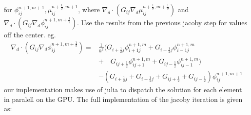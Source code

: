 \documentclass{mimosis}
\begin{document}
for \(\phi_{ij}^{n+1,m+1} , \mu_{ij}^{n+\frac{1}{2},m+1}\),
where \(\nabla _d \cdot (G_{ij} \nabla_d \mu_{ij}^{n+\frac{1}{2},m+\frac{1}{2}} )\) and \(\nabla_d \cdot  (G_{ij} \nabla _d \phi_{ij}^{n+1,m+\frac{1}{2}} )\).  Use the results from the previous jacoby step for values off the center. eg.
\begin{equation}
\begin{aligned}
 \nabla _d \cdot (G_{ij} \nabla_d \phi_{ij}^{n+1,m+\frac{1}{2}} )  =&
\frac{1}{h^2} (
G_{i+\frac{1}{2}j}\phi_{i+1j}^{n+1,m}
+ G_{i-\frac{1}{2}j}\phi_{i-1j}^{n+1,m} \\
& + \quad G_{ij+\frac{1}{2}}\phi_{ij+1}^{n+1,m}
+ G_{ij-\frac{1}{2}}\phi_{ij-1}^{n+1,m}
 ) \\
& -
\left(
 G_{i+\frac{1}{2}j}
 + G_{i-\frac{1}{2}j}
 + G_{ij+\frac{1}{2}}
 + G_{ij-\frac{1}{2}}
\right)\phi_{ij}^{n+1,m+1}
\end{aligned}
\end{equation}
our implementation makes use of julia to dispatch the solution for each element in paralell on the GPU. The full implementation of the jacoby iteration is given as:
\end{document}
